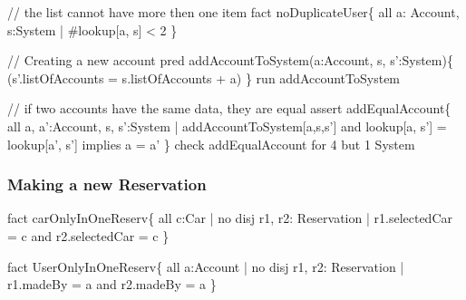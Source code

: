 \documentclass[a4paper]{article}
\begin{document}
// the list cannot have more then one item  \newline
fact noDuplicateUser\{  \newline
\hspace*{5 mm}	all a: Account, s:System |  \newline
\hspace*{5 mm}	\#lookup[a, s] < 2  \newline
\}  \newline

// Creating a new account  \newline
pred addAccountToSystem(a:Account, s, s':System)\{  \newline
\hspace*{5 mm}	(s'.listOfAccounts = s.listOfAccounts + a)  \newline
\}  \newline
run addAccountToSystem  \newline

// if two accounts have the same data, they are equal  \newline  
assert addEqualAccount\{  \newline
\hspace*{5 mm}	all a, a':Account, s, s':System |  \newline
\hspace*{5 mm}		addAccountToSystem[a,s,s'] and lookup[a, s'] = lookup[a', s']  \newline
\hspace*{5 mm}		implies  \newline
\hspace*{5 mm}		a = a'   \newline		
\}  \newline
check addEqualAccount for 4 but 1 System  \newline
\subsubsection{Making a new Reservation}
fact carOnlyInOneReserv\{ \newline
\hspace*{5 mm}	all c:Car | no disj r1, r2: Reservation | \newline
\hspace*{5 mm}		r1.selectedCar = c and r2.selectedCar = c \newline
\} \newline

fact UserOnlyInOneReserv\{ \newline
\hspace*{5 mm}	all a:Account | no disj r1, r2: Reservation | \newline
\hspace*{5 mm}		r1.madeBy = a and r2.madeBy = a \newline
\} \newline
\end{document}
